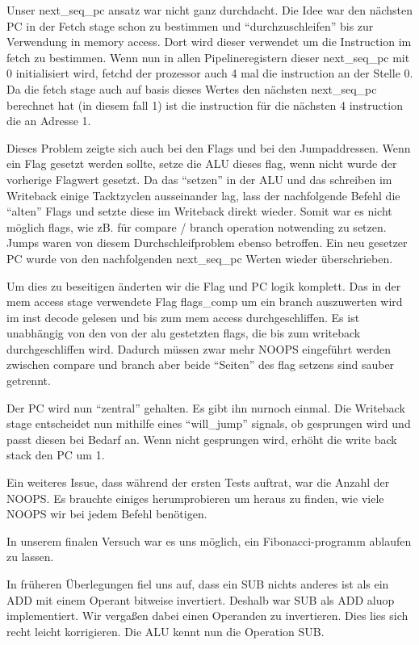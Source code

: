 \documentclass[paper=a4,fontsize=12pt,twocolumn]{scrreprt}
\begin{document}
Unser next\_seq\_pc ansatz war nicht ganz durchdacht.
Die Idee war den nächsten PC in der Fetch stage schon zu bestimmen und \enquote{durchzuschleifen} bis zur Verwendung in memory access.
Dort wird dieser verwendet um die Instruction im fetch zu bestimmen.
Wenn nun in allen Pipelineregistern dieser next\_seq\_pc mit 0 initialisiert wird, fetchd der prozessor auch 4 mal die instruction an der Stelle 0.
Da die fetch stage auch auf basis dieses Wertes den nächsten next\_seq\_pc berechnet hat (in diesem fall 1) ist die instruction für die nächsten 4 instruction die an Adresse 1.

Dieses Problem zeigte sich auch bei den Flags und bei den Jumpaddressen.
Wenn ein Flag gesetzt werden sollte, setze die ALU dieses flag, wenn nicht wurde der vorherige Flagwert gesetzt.
Da das \enquote{setzen} in der ALU und das schreiben im Writeback einige Tacktzyclen ausseinander lag, lass der nachfolgende Befehl die \enquote{alten} Flags und setzte diese im Writeback direkt wieder.
Somit war es nicht möglich flags, wie zB. für compare / branch operation notwending zu setzen.
Jumps waren von diesem Durchschleifproblem ebenso betroffen. Ein neu gesetzer PC wurde von den nachfolgenden next\_seq\_pc Werten wieder überschrieben.

Um dies zu beseitigen änderten wir die Flag und PC logik komplett.
Das in der mem access stage verwendete Flag flags\_comp um ein branch auszuwerten wird im inst decode gelesen und bis zum mem access durchgeschliffen.
Es ist unabhängig von den von der alu gestetzten flags, die bis zum writeback durchgeschliffen wird.
Dadurch müssen zwar mehr NOOPS eingeführt werden zwischen compare und branch aber beide \enquote{Seiten} des flag setzens sind sauber getrennt.

Der PC wird nun \enquote{zentral} gehalten.
Es gibt ihn nurnoch einmal.
Die Writeback stage entscheidet nun mithilfe eines \enquote{will\_jump} signals, ob gesprungen wird und passt diesen bei Bedarf an.
Wenn nicht gesprungen wird, erhöht die write back stack den PC um 1.

Ein weiteres Issue, dass während der ersten Tests auftrat, war die Anzahl der NOOPS.
Es brauchte einiges herumprobieren um heraus zu finden, wie viele NOOPS wir bei jedem Befehl benötigen.

In unserem finalen Versuch war es uns möglich, ein Fibonacci-programm ablaufen zu lassen.

In früheren Überlegungen fiel uns auf, dass ein SUB nichts anderes ist als ein ADD mit einem Operant bitweise invertiert.
Deshalb war SUB als ADD aluop implementiert.
Wir vergaßen dabei einen Operanden zu invertieren.
Dies lies sich recht leicht korrigieren.
Die ALU kennt nun die Operation SUB.
\end{document}

